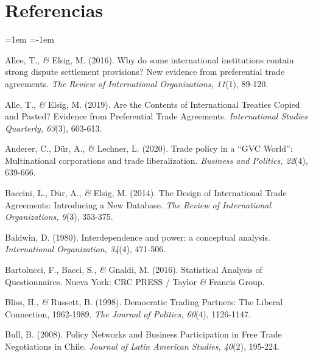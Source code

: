 \documentclass[a4paper]{tufte-handout}
\begin{document}

\section{{\normalfont Referencias}}


\begin{list}{}%
{\leftmargin=1em \itemindent=-1em}

\item{\small Allee, T., {\itshape \&} Elsig, M. (2016). Why do some international institutions contain strong dispute settlement provisions? New evidence from preferential trade agreements. {\itshape The Review of International Organizations, 11}(1), 89-120.}

\item{\small Alle, T., {\itshape \&} Elsig, M. (2019). Are the Contents of International Treaties Copied and Pasted? Evidence from Preferential Trade Agreements. {\itshape International Studies Quarterly, 63}(3), 603-613.}

\item{\small Anderer, C., Dür, A., {\itshape \&} Lechner, L. (2020). Trade policy in a “GVC World”: Multinational corporations and trade liberalization. {\itshape Business and Politics, 22}(4), 639-666.}

\item{\small Baccini, L., Dür, A., {\itshape \&} Elsig, M. (2014). The Design of International Trade Agreements: Introducing a New Database. {\itshape The Review of International Organizations, 9}(3), 353-375.}

\item{\small Baldwin, D. (1980). Interdependence and power: a conceptual analysis. {\itshape International Organization, 34}(4), 471-506.}

\item{\small Bartolucci, F., Bacci, S., {\itshape \&} Gnaldi, M. (2016). Statistical Analysis of Questionnaires. Nueva York: CRC PRESS / Taylor {\itshape \&} Francis Group.}

\item{\small Bliss, H., {\itshape \&} Russett, B. (1998). Democratic Trading Partners: The Liberal Connection, 1962-1989. {\itshape The Journal of Politics, 60}(4), 1126-1147.}

\item{\small Bull, B. (2008). Policy Networks and Business Participation in Free Trade Negotiations in Chile. {\itshape Journal of Latin American Studies, 40}(2), 195-224.}


\end{list}
\end{document}
